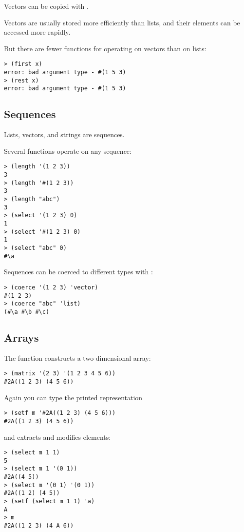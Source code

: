 \begin{slide}{}
Vectors can be copied with .

Vectors are usually stored more efficiently than lists, and their
elements can be accessed more rapidly.

But there are fewer functions for operating on vectors than on lists:
{\Large
\begin{verbatim}
> (first x)
error: bad argument type - #(1 5 3)
> (rest x)
error: bad argument type - #(1 5 3)
\end{verbatim}}
\end{slide}

\begin{slide}{}
\subsection{Sequences}
Lists, vectors, and strings are sequences.

Several functions operate on any sequence:
{\Large
\begin{verbatim}
> (length '(1 2 3))
3
> (length '#(1 2 3))
3
> (length "abc")
3
> (select '(1 2 3) 0)
1
> (select '#(1 2 3) 0)
1
> (select "abc" 0)
#\a
\end{verbatim}}
Sequences can be coerced to different types with :
{\Large
\begin{verbatim}
> (coerce '(1 2 3) 'vector)
#(1 2 3)
> (coerce "abc" 'list)
(#\a #\b #\c)
\end{verbatim}}
\end{slide}

\begin{slide}{}
\subsection{Arrays}
The  function constructs a two-dimensional array:
{\Large
\begin{verbatim}
> (matrix '(2 3) '(1 2 3 4 5 6))
#2A((1 2 3) (4 5 6))
\end{verbatim}}
Again you can type the printed representation
{\Large
\begin{verbatim}
> (setf m '#2A((1 2 3) (4 5 6)))
#2A((1 2 3) (4 5 6))
\end{verbatim}}
and  extracts and modifies elements:
{\Large
\begin{verbatim}
> (select m 1 1)
5
> (select m 1 '(0 1))
#2A((4 5))
> (select m '(0 1) '(0 1))
#2A((1 2) (4 5))
> (setf (select m 1 1) 'a)
A
> m
#2A((1 2 3) (4 A 6))
\end{verbatim}}
\end{slide}

